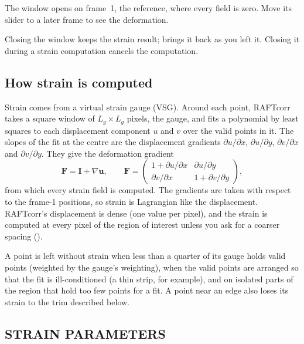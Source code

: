 \begin{tipbox}
The window opens on frame~1, the reference, where every field is zero. Move its slider to a later
frame to see the deformation.
\end{tipbox}

Closing the window keeps the strain result;  brings it back as you left
it. Closing it during a strain computation cancels the computation.

\subsection{How strain is computed}

Strain comes from a virtual strain gauge (VSG). Around each point, RAFTcorr takes a square window
of $L_g \times L_g$ pixels, the gauge, and fits a polynomial by least squares to each displacement
component $u$ and $v$ over the valid points in it. The slopes of the fit at the centre are the
displacement gradients $\partial u/\partial x$, $\partial u/\partial y$, $\partial v/\partial x$
and $\partial v/\partial y$. They give the deformation gradient
\[
  \mathbf{F} = \mathbf{I} + \nabla\mathbf{u}, \qquad
  \mathbf{F} = \begin{pmatrix} 1 + \partial u/\partial x & \partial u/\partial y \\
  \partial v/\partial x & 1 + \partial v/\partial y \end{pmatrix},
\]
from which every strain field is computed. The gradients are taken with respect to the frame-1
positions, so strain is Lagrangian like the displacement. RAFTcorr's displacement is dense (one
value per pixel), and the strain is computed at every pixel of the region of interest unless you
ask for a coarser spacing ().

A point is left without strain when less than a quarter of its gauge holds valid points
(weighted by the gauge's weighting), when the valid points are arranged so that the fit is
ill-conditioned (a thin strip, for example), and on isolated parts of the region that hold too few
points for a fit. A point near an edge also loses its strain to the trim described below.

\subsection{STRAIN PARAMETERS}


